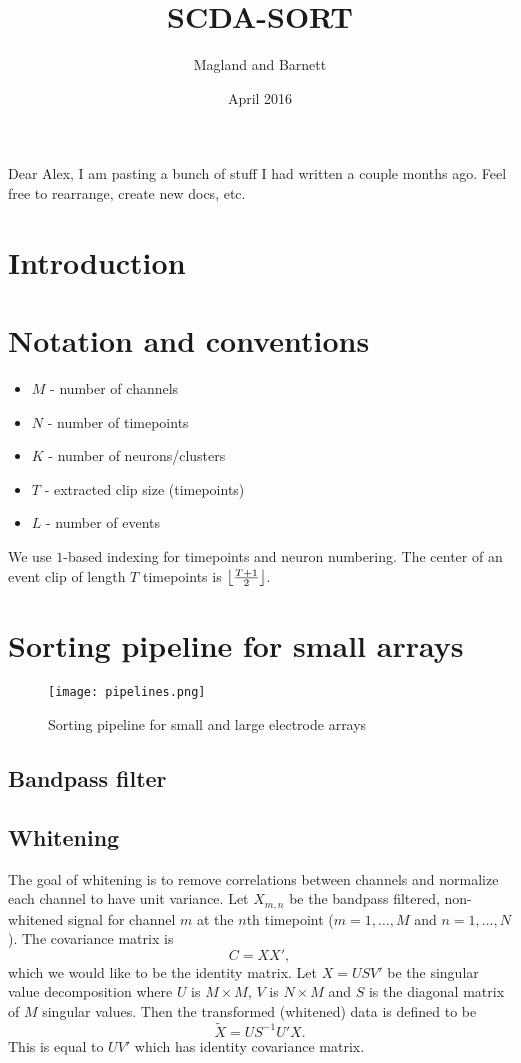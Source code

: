 \documentclass{article}
\title{SCDA-SORT}
\author{Magland and Barnett}
\date{April 2016}
\DeclarePairedDelimiter\floor{\lfloor}{\rfloor}
\begin{document}
\maketitle

Dear Alex, I am pasting a bunch of stuff I had written a couple months ago. Feel free to rearrange, create new docs, etc.

\section{Introduction}

\section{Notation and conventions}

\begin{itemize}
    \item[] $M$ - number of channels
    \item[] $N$ - number of timepoints
    \item[] $K$ - number of neurons/clusters
    \item[] $T$ - extracted clip size (timepoints)
    \item[] $L$ - number of events
\end{itemize}

We use $1$-based indexing for timepoints and neuron numbering. The center of an event clip of length $T$ timepoints is $\floor*{\frac{T+1}{2}}$.

\section{Sorting pipeline for small arrays}

\begin{figure}[h]
\caption{Sorting pipeline for small and large electrode arrays}
\texttt{[image: pipelines.png]}
\end{figure}

\subsection{Bandpass filter}

\subsection{Whitening}

The goal of whitening is to remove correlations between channels and normalize each channel to have unit variance. Let $X_{m,n}$ be the bandpass filtered, non-whitened signal for channel $m$ at the $n$th timepoint ($m=1,\dots,M$ and $n=1,\dots,N$). The covariance matrix is
$$C=X X',$$
which we would like to be the identity matrix. Let
$X=USV'$ be the singular value decomposition where $U$ is $M\times M$, $V$ is $N\times M$ and $S$ is the diagonal matrix of $M$ singular values.
Then the transformed (whitened) data is defined to be
$$\tilde{X}=US^{-1}U'X.$$
This is equal to $UV'$ which has identity covariance matrix.
\end{document}
